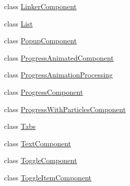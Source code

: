 \begin{DoxyCompactItemize}
class \hyperlink{class_unity_engine_1_1_u_i_1_1_windows_1_1_components_1_1_linker_component}{Linker\+Component}
\item 
class \hyperlink{class_unity_engine_1_1_u_i_1_1_windows_1_1_components_1_1_list}{List}
\item 
class \hyperlink{class_unity_engine_1_1_u_i_1_1_windows_1_1_components_1_1_popup_component}{Popup\+Component}
\item 
class \hyperlink{class_unity_engine_1_1_u_i_1_1_windows_1_1_components_1_1_progress_animated_component}{Progress\+Animated\+Component}
\item 
class \hyperlink{class_unity_engine_1_1_u_i_1_1_windows_1_1_components_1_1_progress_animation_processing}{Progress\+Animation\+Processing}
\item 
class \hyperlink{class_unity_engine_1_1_u_i_1_1_windows_1_1_components_1_1_progress_component}{Progress\+Component}
\item 
class \hyperlink{class_unity_engine_1_1_u_i_1_1_windows_1_1_components_1_1_progress_with_particles_component}{Progress\+With\+Particles\+Component}
\item 
class \hyperlink{class_unity_engine_1_1_u_i_1_1_windows_1_1_components_1_1_tabs}{Tabs}
\item 
class \hyperlink{class_unity_engine_1_1_u_i_1_1_windows_1_1_components_1_1_text_component}{Text\+Component}
\item 
class \hyperlink{class_unity_engine_1_1_u_i_1_1_windows_1_1_components_1_1_toggle_component}{Toggle\+Component}
\item 
class \hyperlink{class_unity_engine_1_1_u_i_1_1_windows_1_1_components_1_1_toggle_item_component}{Toggle\+Item\+Component}
\end{DoxyCompactItemize}
